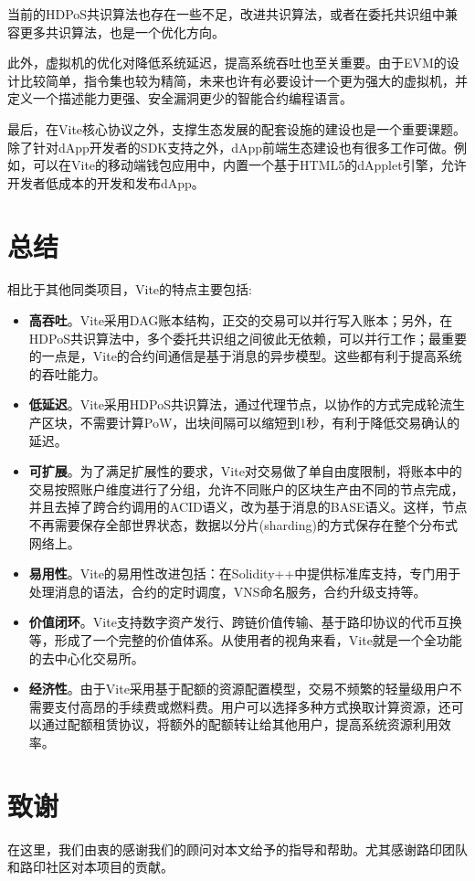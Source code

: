 \documentclass[UTF8,nofonts]{ctexart}
\begin{document}
\begin{multicols}{2}
当前的HDPoS共识算法也存在一些不足，改进共识算法，或者在委托共识组中兼容更多共识算法，也是一个优化方向。

此外，虚拟机的优化对降低系统延迟，提高系统吞吐也至关重要。由于EVM的设计比较简单，指令集也较为精简，未来也许有必要设计一个更为强大的虚拟机，并定义一个描述能力更强、安全漏洞更少的智能合约编程语言。

最后，在Vite核心协议之外，支撑生态发展的配套设施的建设也是一个重要课题。除了针对dApp开发者的SDK支持之外，dApp前端生态建设也有很多工作可做。例如，可以在Vite的移动端钱包应用中，内置一个基于HTML5的dApplet引擎，允许开发者低成本的开发和发布dApp。

\section{总结}
相比于其他同类项目，Vite的特点主要包括:

\begin{itemize}
	\item \textbf{高吞吐}。Vite采用DAG账本结构，正交的交易可以并行写入账本；另外，在HDPoS共识算法中，多个委托共识组之间彼此无依赖，可以并行工作；最重要的一点是，Vite的合约间通信是基于消息的异步模型。这些都有利于提高系统的吞吐能力。
	\item \textbf{低延迟}。Vite采用HDPoS共识算法，通过代理节点，以协作的方式完成轮流生产区块，不需要计算PoW，出块间隔可以缩短到1秒，有利于降低交易确认的延迟。
	\item \textbf{可扩展}。为了满足扩展性的要求，Vite对交易做了单自由度限制，将账本中的交易按照账户维度进行了分组，允许不同账户的区块生产由不同的节点完成，并且去掉了跨合约调用的ACID语义，改为基于消息的BASE语义。这样，节点不再需要保存全部世界状态，数据以分片(sharding)的方式保存在整个分布式网络上。
	\item \textbf{易用性}。Vite的易用性改进包括：在Solidity++中提供标准库支持，专门用于处理消息的语法，合约的定时调度，VNS命名服务，合约升级支持等。
	\item \textbf{价值闭环}。Vite支持数字资产发行、跨链价值传输、基于路印协议的代币互换等，形成了一个完整的价值体系。从使用者的视角来看，Vite就是一个全功能的去中心化交易所。
	\item \textbf{经济性}。由于Vite采用基于配额的资源配置模型，交易不频繁的轻量级用户不需要支付高昂的手续费或燃料费。用户可以选择多种方式换取计算资源，还可以通过配额租赁协议，将额外的配额转让给其他用户，提高系统资源利用效率。
\end{itemize}
\section{致谢}
在这里，我们由衷的感谢我们的顾问对本文给予的指导和帮助。尤其感谢路印团队和路印社区对本项目的贡献。

\end{multicols}
\end{document}
